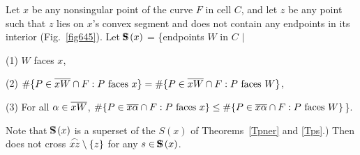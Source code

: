 \begin{lemma}
\label{lem-645}
Let $x$ be any nonsingular point of the curve $F$ in cell $C$,
and let $z$ be any point such that $z$ lies on $x$'s convex segment
and  does not contain any endpoints in its interior 
{\rm (}Fig.~{\rm \ref{fig645})}.
Let $\mbox{S\hspace{-0.68em}S\hspace{.25em}}(x)$ = \{endpoints $W$ in $C$ $\mid$

{\rm (1)} $W$ faces $x$,

{\rm (2)} \mbox{$\#\{P \in\mbox{$\overline{xW}$}\cap F: P \mbox{ faces $x$}\} =
\#\{P \in \mbox{$\overline{xW}$}\cap F: P \mbox{ faces $W$} \}$},

{\rm (3)} For all $\alpha \in \mbox{$\overline{xW}$}$,
$\#\{P \in\mbox{$\overline{x\alpha}$}\cap F: P \mbox{ faces $x$}\} \leq
\#\{P \in \mbox{$\overline{x\alpha}$}\cap F: P \mbox{ faces $W$}\} $\}.

\vspace{.05in}

\noindent {\rm (}Note that 
$\mbox{S\hspace{-0.68em}S\hspace{.25em}}(x)$ is a superset of the $S(x)$ of Theorems~{\rm \ref{Tpner}} and {\rm \ref{Tps}.)}
Then  does not cross $\mbox{$\stackrel{\frown}{xz}$} \setminus \{z\}$ 
for any $s \in \mbox{S\hspace{-0.68em}S\hspace{.25em}}(x)$.
\end{lemma}
%
%
